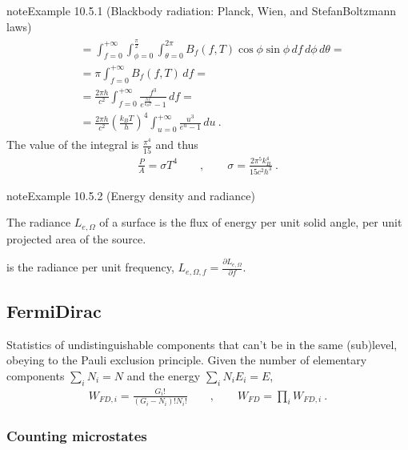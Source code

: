 \documentclass[letterpaper,10pt,english]{jupyterBook}
\begin{document}
\begin{sphinxadmonition}{note}{Example 10.5.1 (Black\sphinxhyphen{}body radiation: Planck, Wien, and Stefan\sphinxhyphen{}Boltzmann laws)}
\begin{equation*}
\begin{split}
\begin{aligned}
  & = \int_{f=0}^{+\infty} \int_{\phi = 0}^{\frac{\pi}{2}} \int_{\theta=0}^{2\pi} B_{f}(f,T) \cos \phi \sin \phi \, df \, d\phi \, d \theta = \\
  & = \pi \int_{f=0}^{+\infty} B_{f}(f,T) \, d f = \\
  & = \frac{2 \pi h}{c^2} \int_{f=0}^{+\infty} \frac{f^3}{e^{\frac{hf}{k_B T}} - 1} \, d f = \\
  & = \frac{2 \pi h}{c^2} \left( \frac{k_B T}{h} \right)^4 \int_{u=0}^{+\infty} \frac{u^3}{e^u - 1} \, d u \ .
\end{aligned}\end{split}
\end{equation*}
\sphinxAtStartPar
The value of the integral is \(\frac{\pi^4}{15}\) and thus
\begin{equation*}
\begin{split}\frac{P}{A} = \sigma T^4 \qquad , \qquad \sigma = \frac{2 \pi^5 k_B^4}{15 c^2 h^3} \ .\end{split}
\end{equation*}\end{sphinxadmonition}
\label{ch/statistical-mechanics/notes:example-1}
\begin{sphinxadmonition}{note}{Example 10.5.2 (Energy density and radiance)}



\sphinxAtStartPar
{} The radiance \(L_{e,\Omega}\) of a surface is the flux of energy per unit solid angle, per unit projected area of the source.

\sphinxAtStartPar
{} is the radiance per unit frequency, \(L_{e, \Omega, f} = \frac{\partial L_{e,\Omega}}{\partial f}\).
\end{sphinxadmonition}


\subsection{Fermi\sphinxhyphen{}Dirac}
\label{\detokenize{ch/statistical-mechanics/notes:fermi-dirac}}\label{\detokenize{ch/statistical-mechanics/notes:statistical-mechanics-notes-distributions-fd}}
\sphinxAtStartPar
Statistics of undistinguishable components that can’t be in the same (sub)level, obeying to the Pauli exclusion principle.
Given the number of elementary components \(\sum_{i} N_i = N\) and the energy \(\sum_{i} N_i E_i = E\),
\begin{equation}\label{equation:ch/statistical-mechanics/notes:eq:fd}
\begin{split}W_{FD,i} = \frac{G_i!}{(G_i-N_i)! N_i!} \qquad , \qquad W_{FD} = \prod_i W_{FD,i} \ .\end{split}
\end{equation}\subsubsection*{Counting microstates}
\end{document}
